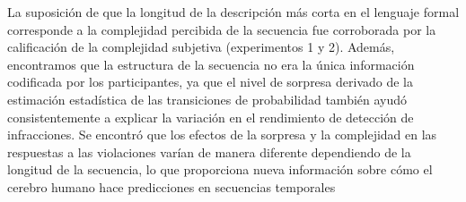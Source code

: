 La suposición de que la longitud de la descripción más corta en el lenguaje formal corresponde a la complejidad percibida de la secuencia fue corroborada por la calificación de la complejidad subjetiva (experimentos 1 y 2). Además, encontramos que la estructura de la secuencia no era la única información codificada por los participantes, ya que el nivel de sorpresa derivado de la estimación estadística de las transiciones de probabilidad también ayudó consistentemente a explicar la variación en el rendimiento de detección de infracciones. Se encontró que los efectos de la sorpresa y la complejidad en las respuestas a las violaciones varían de manera diferente dependiendo de la longitud de la secuencia, lo que proporciona nueva información sobre cómo el cerebro humano hace predicciones en secuencias temporales


